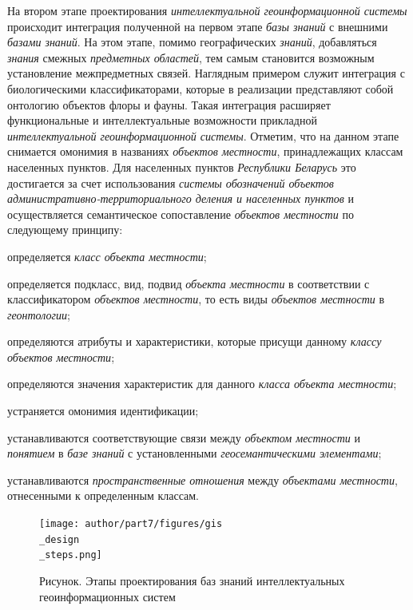 На втором этапе проектирования \textit{интеллектуальной геоинформационной системы} происходит интеграция полученной на первом этапе \textit{базы знаний} с внешними \textit{базами знаний}. На этом этапе, помимо географических \textit{знаний}, добавляться \textit{знания} смежных \textit{предметных областей}, тем самым становится возможным установление межпредметных связей. Наглядным примером служит интеграция с биологическими классификаторами, которые в реализации представляют собой онтологию объектов флоры и фауны. Такая интеграция расширяет функциональные и интеллектуальные возможности прикладной \textit{интеллектуальной геоинформационной системы}. Отметим, что на данном этапе снимается омонимия в названиях \textit{объектов местности}, принадлежащих классам населенных пунктов. Для населенных пунктов \textit{Республики Беларусь} это достигается за счет использования \textit{системы обозначений объектов административно-территориального деления и населенных пунктов} и осуществляется семантическое сопоставление \textit{объектов местности} по следующему принципу:
\begin{textitemize}
	\item определяется \textit{класс объекта местности\scnsupergroupsign};
	\item определяется подкласс, вид, подвид \textit{объекта местности} в соответствии с классификатором \textit{объектов местности}, то есть виды \textit{объектов местности} в \textit{геонтологии};
	\item определяются атрибуты и характеристики, которые присущи данному \textit{классу объектов местности\scnsupergroupsign};
	\item определяются значения характеристик для данного \textit{класса объекта местности\scnsupergroupsign};
	\item устраняется омонимия идентификации;
	\item устанавливаются соответствующие связи между \textit{объектом местности} и \textit{понятием} в \textit{базе знаний} с установленными \textit{геосемантическими элементами};
	\item устанавливаются \textit{пространственные отношения} между \textit{объектами местности}, отнесенными к определенным классам.
\end{textitemize}

\begin{figure}[H]
	\center
	\caption{Рисунок. Этапы проектирования баз знаний интеллектуальных геоинформационных систем}
	\texttt{[image: author/part7/figures/gis\\\_design\\\_steps.png]}
	\label{fig:gis_design_steps}
\end{figure}

